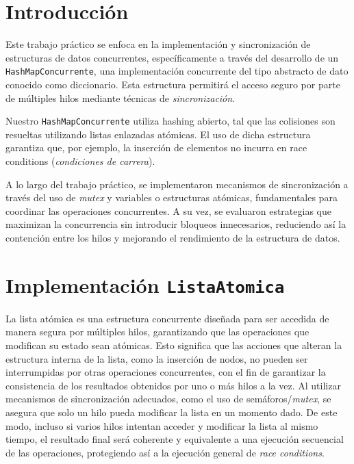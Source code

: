 \documentclass[a4paper]{article}
\begin{document}

\newcommand{\dato}{\textit{Dato}}
\newcommand{\individuo}{\textit{Individuo}}


\maketitle

\section{Introducción}

Este trabajo práctico se enfoca en la implementación y sincronización de estructuras de datos concurrentes, específicamente a través del desarrollo de un \texttt{HashMapConcurrente}, una implementación concurrente del tipo abstracto de dato conocido como diccionario. Esta estructura permitirá el acceso seguro por parte de múltiples hilos mediante técnicas de \textit{sincronización}.

Nuestro \texttt{HashMapConcurrente} utiliza hashing abierto, tal que las colisiones son resueltas utilizando listas enlazadas atómicas. El uso de dicha estructura garantiza que, por ejemplo, la inserción de elementos no incurra en race conditions (\textit{condiciones de carrera}).

A lo largo del trabajo práctico, se implementaron mecanismos de sincronización a través del uso de \textit{mutex} y variables o estructuras atómicas, fundamentales para coordinar las operaciones concurrentes. A su vez, se evaluaron estrategias que maximizan la concurrencia sin introducir bloqueos innecesarios, reduciendo así la contención entre los hilos y mejorando el rendimiento de la estructura de datos.


\section{Implementación \texttt{ListaAtomica}}

    La lista atómica es una estructura concurrente diseñada para ser accedida de manera segura por múltiples hilos, garantizando que las operaciones que modifican su estado sean atómicas. Esto significa que las acciones que alteran la estructura interna de la lista, como la inserción de nodos, no pueden ser interrumpidas por otras operaciones concurrentes, con el fin de garantizar la consistencia de los resultados obtenidos por uno o más hilos a la vez. Al utilizar mecanismos de sincronización adecuados, como el uso de semáforos/\textit{mutex}, se asegura que solo un hilo pueda modificar la lista en un momento dado. De este modo, incluso si varios hilos intentan acceder y modificar la lista al mismo tiempo, el resultado final será coherente y equivalente a una ejecución secuencial de las operaciones, protegiendo así a la ejecución general de \textit{race conditions}.
\end{document}

